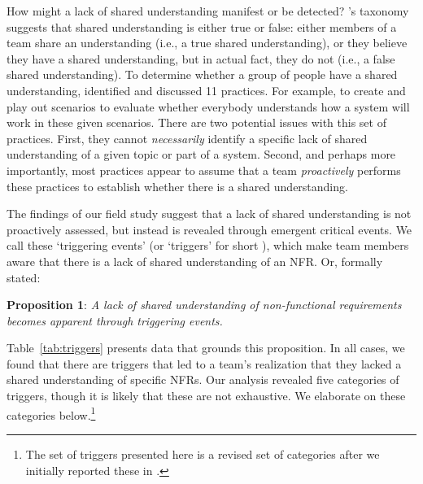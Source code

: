 \documentclass[smallextended]{svjour3}        %
\newcommand\cwproposition[2]{
\normalsize 
\vspace{0.5em}%
\noindent \textbf{\sffamily\fontsize{9}{11}\selectfont Proposition #1}: \textit{#2} %
\vspace{0.5em} %
}
\begin{document}
How might a lack of shared understanding manifest or be detected?
\cite{glinz_shared_2015}'s taxonomy suggests that shared understanding is either true or false: either members of a team share an understanding (i.e., a true shared understanding), or they believe they have a shared understanding, but in actual fact, they do not (i.e., a false shared understanding). 
To determine whether a group of people have a shared understanding, \cite{glinz_shared_2015} identified and discussed 11 practices. For example, to create and play out scenarios to evaluate whether everybody understands how a system will work in these given scenarios. 
There are two potential issues with this set of practices. First, they cannot \textit{necessarily} identify a \textmd{specific} lack of shared understanding of a given topic or part of a system. Second, and perhaps more importantly, most practices appear to assume that a team \textit{proactively} performs these practices to establish whether there is a shared understanding. 

The findings of our field study suggest that a lack of shared understanding is not proactively assessed, but instead is revealed through emergent critical events. 
We call these `triggering events' (or `triggers' for short \citep{werner2020re}), which make team members aware that there is a lack of shared understanding of an NFR. Or, formally stated:

\cwproposition{1}{A lack of shared understanding of non-functional requirements becomes apparent through triggering events.}

Table~\ref{tab:triggers} presents data that grounds this proposition. In all cases, we found that there are triggers that led to a team's realization that they lacked a shared understanding of specific NFRs. 
Our analysis revealed five categories of triggers, though it is likely that these are not exhaustive. We elaborate on these categories below.\footnote{The set of triggers presented here is a revised set of categories after we initially reported these in \cite{werner2020re}.}
\end{document}
